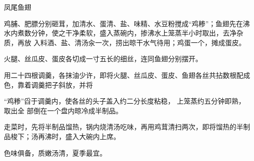 \begin{recipe}{凤尾鱼翅}

\ingredients


\cooking

\step 鸡脯、肥膘分别砸茸，加清水、蛋清、盐、味精、水豆粉搅成“鸡糁”；鱼翅先在沸
水内煮数分钟，使之干净柔软，盛入蒸碗内，掺沸水上笼蒸半小时取出，去净杂质，再放
入料酒、盐、清汤汆一次，捞出晾干水气待用；鸡蛋一个，摊成蛋皮。

\step 火腿、丝瓜皮、蛋皮各切成一寸五长的细丝，连同鱼翅分别摆开。

\step 用二十四根调羹，各抹油少许，即将火腿、丝瓜皮、蛋皮、鱼翅各丝共拈数根配成
色，靠着调羹把子斜放，并将

“鸡糁”舀于调羹内，使各丝的头子盖入约二分长度粘稳， 上笼蒸约五分钟即熟，取出全
部倒在一个盘内晾冷成半制品。

\step 走菜时，先将半制品馏热，锅内烧清汤吃味，再用鸡茸清扫两次，即将馏热的半制
品梭下；汤再沸时，盛入大碗内上席。

\features

色味俱备，质嫩汤清，夏季最宜。

\end{recipe}

